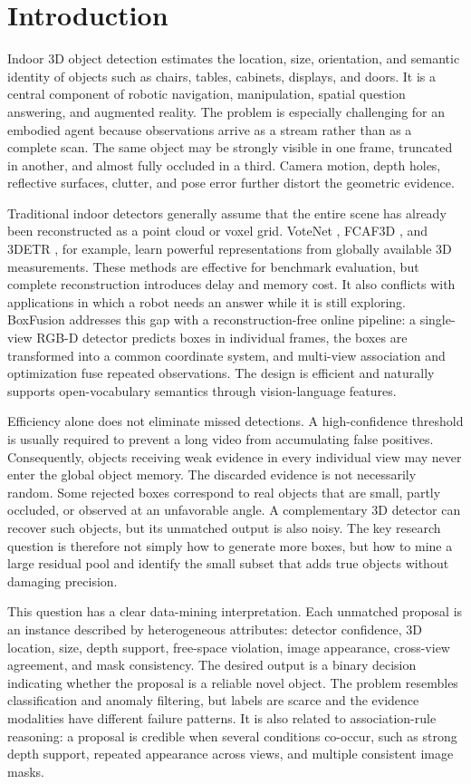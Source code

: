 \documentclass[11pt,a4paper]{article}
\begin{document}
\section{Introduction}
Indoor 3D object detection estimates the location, size, orientation, and semantic identity of objects such as chairs, tables, cabinets, displays, and doors. It is a central component of robotic navigation, manipulation, spatial question answering, and augmented reality. The problem is especially challenging for an embodied agent because observations arrive as a stream rather than as a complete scan. The same object may be strongly visible in one frame, truncated in another, and almost fully occluded in a third. Camera motion, depth holes, reflective surfaces, clutter, and pose error further distort the geometric evidence.

Traditional indoor detectors generally assume that the entire scene has already been reconstructed as a point cloud or voxel grid. VoteNet \cite{qi2019votenet}, FCAF3D \cite{rukhovich2022fcaf3d}, and 3DETR \cite{misra20213detr}, for example, learn powerful representations from globally available 3D measurements. These methods are effective for benchmark evaluation, but complete reconstruction introduces delay and memory cost. It also conflicts with applications in which a robot needs an answer while it is still exploring. BoxFusion \cite{lan2025boxfusion} addresses this gap with a reconstruction-free online pipeline: a single-view RGB-D detector predicts boxes in individual frames, the boxes are transformed into a common coordinate system, and multi-view association and optimization fuse repeated observations. The design is efficient and naturally supports open-vocabulary semantics through vision-language features.

Efficiency alone does not eliminate missed detections. A high-confidence threshold is usually required to prevent a long video from accumulating false positives. Consequently, objects receiving weak evidence in every individual view may never enter the global object memory. The discarded evidence is not necessarily random. Some rejected boxes correspond to real objects that are small, partly occluded, or observed at an unfavorable angle. A complementary 3D detector can recover such objects, but its unmatched output is also noisy. The key research question is therefore not simply how to generate more boxes, but how to mine a large residual pool and identify the small subset that adds true objects without damaging precision.

This question has a clear data-mining interpretation. Each unmatched proposal is an instance described by heterogeneous attributes: detector confidence, 3D location, size, depth support, free-space violation, image appearance, cross-view agreement, and mask consistency. The desired output is a binary decision indicating whether the proposal is a reliable novel object. The problem resembles classification and anomaly filtering, but labels are scarce and the evidence modalities have different failure patterns. It is also related to association-rule reasoning: a proposal is credible when several conditions co-occur, such as strong depth support, repeated appearance across views, and multiple consistent image masks.
\end{document}
